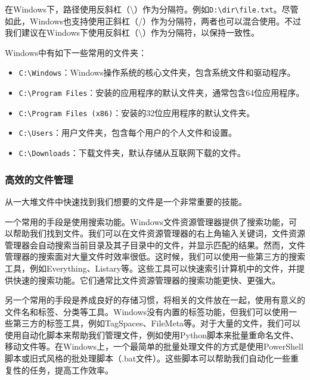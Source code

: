 在Windows下，路径使用反斜杠（\textbackslash）作为分隔符。例如\texttt{D:\textbackslash dir\textbackslash file.txt}。尽管如此，Windows也支持使用正斜杠（/）作为分隔符，两者也可以混合使用。不过我们建议在Windows下使用反斜杠（\textbackslash）作为分隔符，以保持一致性。

Windows中有如下一些常用的文件夹：
\begin{itemize}
  \item \texttt{C:\textbackslash Windows}：Windows操作系统的核心文件夹，包含系统文件和驱动程序。
  \item \texttt{C:\textbackslash Program Files}：安装的应用程序的默认文件夹，通常包含64位应用程序。
  \item \texttt{C:\textbackslash Program Files (x86)}：安装的32位应用程序的默认文件夹。
  \item \texttt{C:\textbackslash Users}：用户文件夹，包含每个用户的个人文件和设置。
  \item \texttt{C:\textbackslash Downloads}：下载文件夹，默认存储从互联网下载的文件。
\end{itemize}

\subsubsection{高效的文件管理}

从一大堆文件中快速找到我们想要的文件是一个非常重要的技能。

一个常用的手段是使用搜索功能。Windows文件资源管理器提供了搜索功能，可以帮助我们找到文件。我们可以在文件资源管理器的右上角输入关键词，文件资源管理器会自动搜索当前目录及其子目录中的文件，并显示匹配的结果。然而，文件管理器的搜索面对大量文件时效率很低。这时候，我们可以使用一些第三方的搜索工具，例如Everything、Listary等。这些工具可以快速索引计算机中的文件，并提供快速的搜索功能。它们通常比文件资源管理器的搜索功能更快、更强大。

另一个常用的手段是养成良好的存储习惯，将相关的文件放在一起，使用有意义的文件名和标签、分类等工具。Windows没有内置的标签功能，但我们可以使用一些第三方的标签工具，例如TagSpaces、FileMeta等。对于大量的文件，我们可以使用自动化脚本来帮助我们管理文件，例如使用Python脚本来批量重命名文件、移动文件等。在Windows上，一个最简单的批量处理文件的方式是使用PowerShell脚本或旧式风格的批处理脚本（.bat文件）。这些脚本可以帮助我们自动化一些重复性的任务，提高工作效率。

